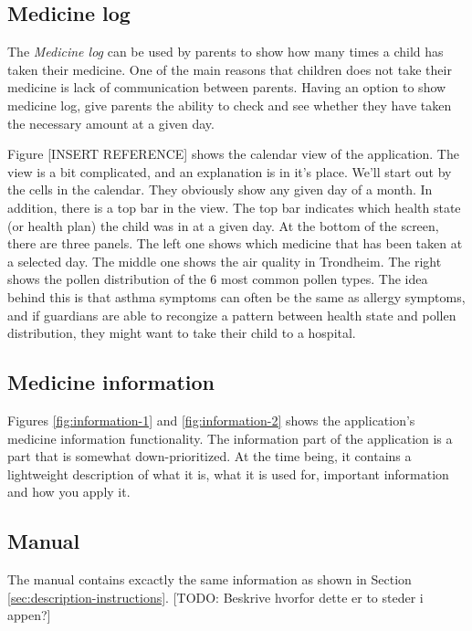 \subsection{Medicine log}
\label{sec:description-medicine-log}
The \emph{Medicine log} can be used by parents to show how many times a child has taken their medicine. One of the main reasons that children does not take their medicine is lack of communication between parents. Having an option to show medicine log, give parents the ability to check and see whether they have taken the necessary amount at a given day.

Figure [INSERT REFERENCE] shows the calendar view of the application. The view is a bit complicated, and an explanation is in it's place. We'll start out by the cells in the calendar. They obviously show any given day of a month. In addition, there is a top bar in the view. The top bar indicates which health state (or health plan) the child was in at a given day. At the bottom of the screen, there are three panels. The left one shows which medicine that has been taken at a selected day. The middle one shows the air quality in Trondheim. The right shows the pollen distribution of the 6 most common pollen types. The idea behind this is that asthma symptoms can often be the same as allergy symptoms, and if guardians are able to recongize a pattern between health state and pollen distribution, they might want to take their child to a hospital.   
 
\subsection{Medicine information}
\label{sec:description-medicine-information}
Figures \ref{fig:information-1} and \ref{fig:information-2} shows the application's medicine information functionality. The information part of the application is a part that is somewhat down-prioritized. At the time being, it contains a lightweight description of what it is, what it is used for, important information and how you apply it. 


\subsection{Manual}
\label{sec:description-manual}
The manual contains excactly the same information as shown in Section \ref{sec:description-instructions}. [TODO: Beskrive hvorfor dette er to steder i appen?]


